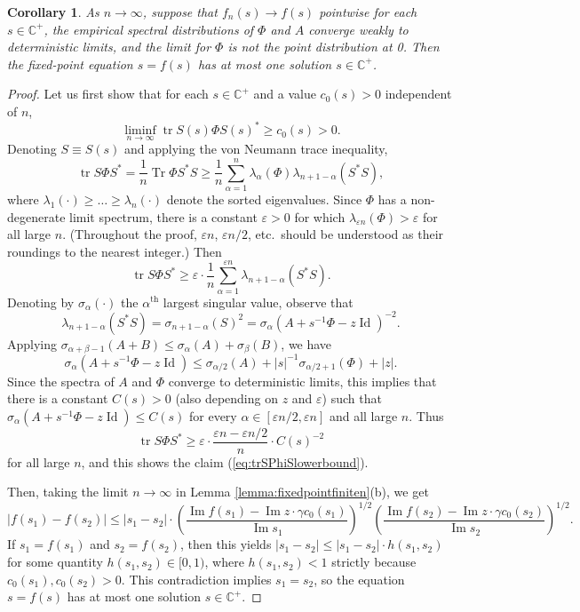 \documentclass{article}
\newtheorem{corollary}[theorem]{Corollary}
\theoremstyle{definition}
\newcommand{\C}{\mathbb{C}}
\newcommand{\Id}{\operatorname{Id}}
\newcommand{\Tr}{\operatorname{Tr}}
\newcommand{\tr}{\operatorname{tr}}
\renewcommand{\a}{\alpha}
\renewcommand{\b}{\beta}
\newcommand{\eps}{\varepsilon}
\newcommand{\1}{\mathbf{1}}
\renewcommand{\Im}{\operatorname{Im}}
\begin{document}
\begin{corollary}\label{cor:fixedpointunique}
As $n \to \infty$, suppose that $f_n(s) \to f(s)$ pointwise for
each $s \in \C^+$, the empirical spectral distributions of $\Phi$ and $A$
converge weakly to deterministic limits, and the limit 
for $\Phi$ is not the point distribution at 0. Then the fixed-point equation
$s=f(s)$ has at most one solution $s \in \C^+$.
\end{corollary}
\begin{proof}
Let us first show that for each $s \in \C^+$ and a value $c_0(s)>0$ independent
of $n$,
\begin{equation}\label{eq:trSPhiSlowerbound}
\liminf_{n \to \infty} \tr S(s)\Phi S(s)^* \geq c_0(s)>0.
\end{equation}
Denoting $S \equiv S(s)$ and applying the von Neumann trace inequality,
\[\tr S\Phi S^*=\frac{1}{n}\Tr \Phi S^*S
\geq \frac{1}{n}\sum_{\a=1}^n \lambda_\a(\Phi)\lambda_{n+1-\a}(S^*S),\]
where $\lambda_1(\cdot) \geq \ldots \geq \lambda_n(\cdot)$ denote the sorted
eigenvalues. Since
$\Phi$ has a non-degenerate limit spectrum, there is a constant $\eps>0$ for
which $\lambda_{\eps n}(\Phi)>\eps$ for all large $n$. (Throughout the proof,
$\eps n$, $\eps n/2$, etc.\ should be understood as their roundings to the
nearest integer.) Then
\[\tr S\Phi S^* \geq \eps \cdot \frac{1}{n}\sum_{\a=1}^{\eps n}
\lambda_{n+1-\a}(S^*S).\]
Denoting by $\sigma_\a(\cdot)$ the $\a^\text{th}$ largest singular value,
observe that
\[\lambda_{n+1-\a}(S^*S)=\sigma_{n+1-\a}(S)^2
=\sigma_\a(A+s^{-1}\Phi-z\Id)^{-2}.\]
Applying $\sigma_{\a+\b-1}(A+B) \leq \sigma_\a(A)+\sigma_\b(B)$, we have
\[\sigma_\a(A+s^{-1}\Phi-z\Id) \leq
\sigma_{\a/2}(A)+|s|^{-1}\sigma_{\a/2+1}(\Phi)+|z|.\]
Since the spectra of $A$ and $\Phi$ converge to deterministic limits,
this implies that there is a constant
$C(s)>0$ (also depending on $z$ and $\eps$)
such that $\sigma_\a(A+s^{-1}\Phi-z\Id) \leq C(s)$ for
every $\a \in [\eps n/2,\eps n]$ and all large $n$. Thus
\[\tr S\Phi S^* \geq \eps \cdot \frac{\eps n-\eps n/2}{n} \cdot C(s)^{-2}\]
for all large $n$, and this shows the claim (\ref{eq:trSPhiSlowerbound}).

Then, taking the limit $n \to \infty$ in
Lemma \ref{lemma:fixedpointfiniten}(b), we get
\[|f(s_1)-f(s_2)| \leq |s_1-s_2|
\cdot \left(\frac{\Im f(s_1)-\Im z \cdot \gamma c_0(s_1)}{\Im s_1}\right)^{1/2}
\left(\frac{\Im f(s_2)-\Im z \cdot \gamma c_0(s_2)}{\Im s_2}\right)^{1/2}.\]
If $s_1=f(s_1)$ and $s_2=f(s_2)$,
then this yields $|s_1-s_2| \leq |s_1-s_2| \cdot h(s_1,s_2)$ for some
quantity $h(s_1,s_2) \in [0,1)$, where $h(s_1,s_2)<1$ strictly because
$c_0(s_1),c_0(s_2)>0$. This contradiction implies $s_1=s_2$, so the equation $s=f(s)$ has at
most one solution $s \in \C^+$.
\end{proof}
\end{document}
